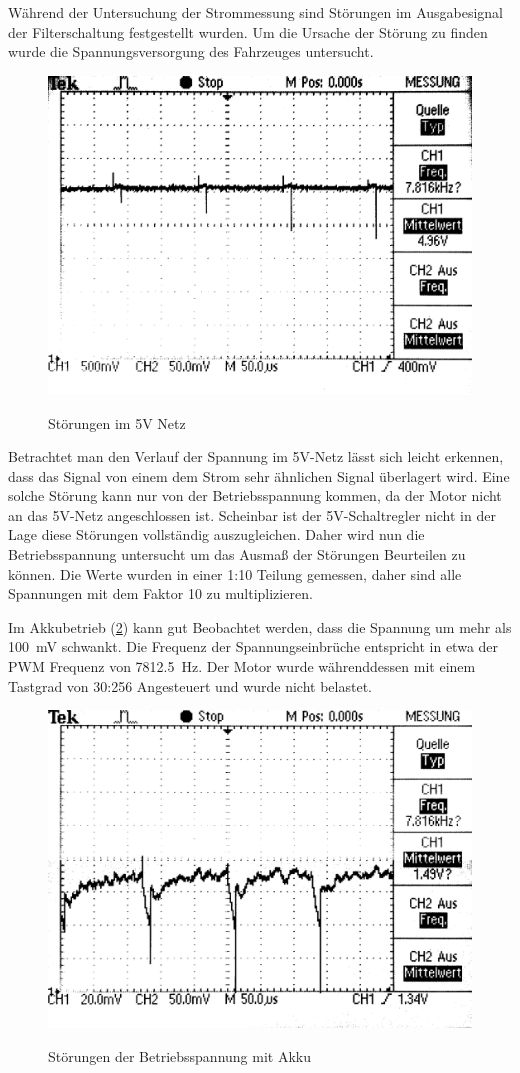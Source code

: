 Während der Untersuchung der Strommessung sind Störungen im Ausgabesignal der Filterschaltung festgestellt wurden. Um die Ursache der Störung zu finden wurde die Spannungsversorgung
des Fahrzeuges untersucht.

\begin{figure}[H]
\centering
\includegraphics[width=.8\textwidth]{5V_supply.png}\\
\caption{Störungen im 5V Netz}%
\label{fig:5V Supply}
\end{figure}

Betrachtet man den Verlauf der Spannung im 5V-Netz lässt sich leicht erkennen, dass das Signal von einem dem Strom sehr ähnlichen Signal überlagert wird.
Eine solche Störung kann nur von der Betriebsspannung kommen, da der Motor nicht an das 5V-Netz angeschlossen ist. Scheinbar ist der 5V-Schaltregler nicht in der Lage diese Störungen vollständig auszugleichen.
Daher wird nun die Betriebsspannung untersucht um das Ausmaß der Störungen Beurteilen zu können.
Die Werte wurden in einer 1:10 Teilung gemessen, daher sind alle Spannungen mit dem Faktor 10 zu multiplizieren.

Im Akkubetrieb (\cref{fig:accu_supply}) kann gut Beobachtet werden, dass die Spannung um mehr als \SI{100}{\mV} schwankt. Die Frequenz der Spannungseinbrüche entspricht in etwa
der PWM Frequenz von \SI{7812,5}{\hertz}.  Der Motor wurde währenddessen mit einem Tastgrad von 30:256 Angesteuert und wurde nicht belastet.


\begin{figure}[H]
\centering
\includegraphics[width=.8\textwidth]{VCC_AKKU.png}\\
\caption{Störungen der Betriebsspannung mit Akku}%
\label{fig:accu_supply}
\end{figure}


